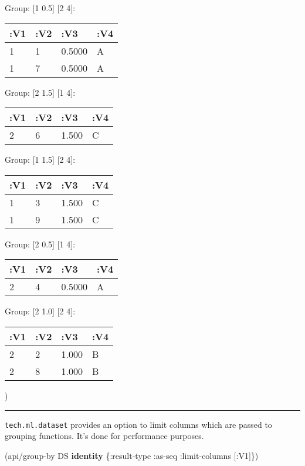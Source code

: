 \documentclass[]{article}
\newenvironment{Shaded}{\begin{snugshade}}{\end{snugshade}}
\newcommand{\KeywordTok}[1]{\textcolor[rgb]{0.13,0.29,0.53}{\textbf{#1}}}
\newcommand{\AttributeTok}[1]{\textcolor[rgb]{0.77,0.63,0.00}{#1}}
\newcommand{\NormalTok}[1]{#1}
\begin{document}
Group: {[}1 0.5{]} {[}2 4{]}:

\begin{longtable}[]{@{}llll@{}}
\toprule
:V1 & :V2 & :V3 & :V4\tabularnewline
\midrule
\endhead
1 & 1 & 0.5000 & A\tabularnewline
1 & 7 & 0.5000 & A\tabularnewline
\bottomrule
\end{longtable}

Group: {[}2 1.5{]} {[}1 4{]}:

\begin{longtable}[]{@{}llll@{}}
\toprule
:V1 & :V2 & :V3 & :V4\tabularnewline
\midrule
\endhead
2 & 6 & 1.500 & C\tabularnewline
\bottomrule
\end{longtable}

Group: {[}1 1.5{]} {[}2 4{]}:

\begin{longtable}[]{@{}llll@{}}
\toprule
:V1 & :V2 & :V3 & :V4\tabularnewline
\midrule
\endhead
1 & 3 & 1.500 & C\tabularnewline
1 & 9 & 1.500 & C\tabularnewline
\bottomrule
\end{longtable}

Group: {[}2 0.5{]} {[}1 4{]}:

\begin{longtable}[]{@{}llll@{}}
\toprule
:V1 & :V2 & :V3 & :V4\tabularnewline
\midrule
\endhead
2 & 4 & 0.5000 & A\tabularnewline
\bottomrule
\end{longtable}

Group: {[}2 1.0{]} {[}2 4{]}:

\begin{longtable}[]{@{}llll@{}}
\toprule
:V1 & :V2 & :V3 & :V4\tabularnewline
\midrule
\endhead
2 & 2 & 1.000 & B\tabularnewline
2 & 8 & 1.000 & B\tabularnewline
\bottomrule
\end{longtable}

)

\begin{center}\rule{0.5\linewidth}{0.5pt}\end{center}

\texttt{tech.ml.dataset} provides an option to limit columns which are
passed to grouping functions. It's done for performance purposes.

\begin{Shaded}
\begin{Highlighting}[]
\NormalTok{(api/group-by DS }\KeywordTok{identity}\NormalTok{ \{}\AttributeTok{:result-type} \AttributeTok{:as-seq}
                           \AttributeTok{:limit-columns}\NormalTok{ [}\AttributeTok{:V1}\NormalTok{]\})}
\end{Highlighting}
\end{Shaded}
\end{document}
